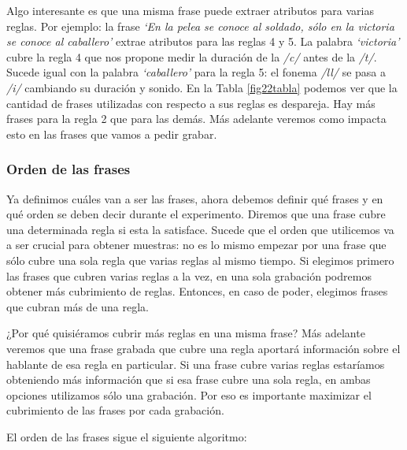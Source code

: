 Algo interesante es que una misma frase puede extraer atributos para varias reglas. Por ejemplo: la frase \textit{`En la pelea se conoce al soldado, sólo en la victoria se conoce al caballero’} extrae atributos para las reglas 4 y 5. La palabra \textit{`victoria’} cubre la regla 4 que nos propone medir la duración de la \textit{/c/} antes de la \textit{/t/}. Sucede igual con la palabra \textit{`caballero’} para la regla 5: el fonema \textit{/ll/} se pasa a \textit{/i/} cambiando su duración y sonido. En la Tabla \ref{fig22tabla} podemos ver que la cantidad de frases utilizadas con respecto a sus reglas es despareja. Hay más frases para la regla 2 que para las demás. Más adelante veremos como impacta esto en las frases que vamos a pedir grabar.


\subsubsection{Orden de las frases}

Ya definimos cuáles van a ser las frases, ahora debemos definir qué frases y en qué orden se deben decir durante el experimento. Diremos que una frase cubre una determinada regla si esta la satisface. Sucede que el orden que utilicemos va a ser crucial para obtener muestras: no es lo mismo empezar por una frase que sólo cubre una sola regla que varias reglas al mismo tiempo. Si elegimos primero las frases que cubren varias reglas a la vez, en una sola grabación podremos obtener más cubrimiento de reglas. Entonces, en caso de poder, elegimos frases que cubran más de una regla. 

¿Por qué quisiéramos cubrir más reglas en una misma frase? Más adelante veremos que una frase grabada que cubre una regla aportará información sobre el hablante de esa regla en particular. Si una frase cubre varias reglas estaríamos obteniendo más información que si esa frase cubre una sola regla, en ambas opciones utilizamos sólo una grabación. Por eso es importante maximizar el cubrimiento de las frases por cada grabación.  

El orden de las frases sigue el siguiente algoritmo:

